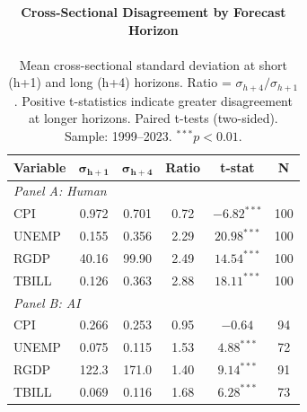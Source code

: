 \documentclass[11pt,letterpaper]{scrartcl}
\begin{document}

\begin{table}[h!]
\centering
\footnotesize
\begin{tabular}{lccccc}
\toprule
\textbf{Variable} & $\boldsymbol{\sigma_{h+1}}$ & $\boldsymbol{\sigma_{h+4}}$ & \textbf{Ratio} & \textbf{t-stat} & \textbf{N} \\
\midrule
\multicolumn{9}{l}{\textit{Panel A: Human}} \\[3pt]
CPI & 0.972 & 0.701 & 0.72 & $-6.82^{***}$ & 100 \\
UNEMP & 0.155 & 0.356 & 2.29 & $20.98^{***}$ & 100 \\
RGDP & 40.16 & 99.90 & 2.49 & $14.54^{***}$ & 100 \\
TBILL & 0.126 & 0.363 & 2.88 & $18.11^{***}$ & 100 \\
\midrule
\multicolumn{9}{l}{\textit{Panel B: AI}} \\[3pt]
CPI & 0.266 & 0.253 & 0.95 & $-0.64$ & 94 \\
UNEMP & 0.075 & 0.115 & 1.53 & $4.88^{***}$ & 72 \\
RGDP & 122.3 & 171.0 & 1.40 & $9.14^{***}$ & 91 \\
TBILL & 0.069 & 0.116 & 1.68 & $6.28^{***}$ & 73 \\
\bottomrule
\end{tabular}
\caption{\textbf{Cross-Sectional Disagreement by Forecast Horizon}\\
\vspace{10pt}\\
\footnotesize{Mean cross-sectional standard deviation at short (h+1) and long (h+4) horizons. Ratio = $\sigma_{h+4}/\sigma_{h+1}$. Positive t-statistics indicate greater disagreement at longer horizons. Paired t-tests (two-sided). Sample: 1999--2023. $^{***}p<0.01$.}}
\label{tab:horizon_dispersion}
\end{table}

\end{document}
